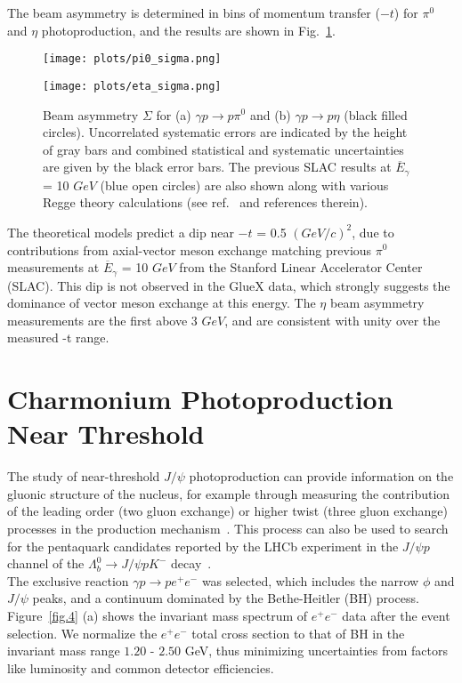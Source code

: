 \documentclass[a4paper]{jpconf}
\begin{document}
The beam asymmetry is determined in bins of momentum transfer ($-t$) for $\pi^{0}$ and $\eta$ photoproduction, and the results are shown in Fig.~\ref{fig.3}.

\begin{figure}[h]
    \centering
    \begin{minipage}{16pc}
        \texttt{[image: plots/pi0\_sigma.png]}
    \end{minipage}\hspace{3pc}%
    \begin{minipage}{16pc}
        \texttt{[image: plots/eta\_sigma.png]}
    \end{minipage}
    \caption{\label{fig.3} Beam asymmetry $\Sigma$ for (a) $\gamma p \rightarrow p \pi^{0}$ and (b) $\gamma p \rightarrow p \eta$ (black filled circles). Uncorrelated systematic errors are indicated by the height of gray bars and combined statistical and systematic uncertainties are given by the black error bars. The previous SLAC results at $\overline{{E}}_{\gamma}$ = 10 $GeV$ (blue open circles) are also shown along with various Regge theory calculations (see ref.~\cite{ref.4} and references therein).}
\end{figure}

The theoretical models predict a dip near $-t$ = 0.5 $(GeV/c)^{2}$, due to contributions from axial-vector meson exchange matching previous $\pi^{0}$ measurements at $\overline{E}_{\gamma}$ = 10 $GeV$ from the Stanford Linear Accelerator Center (SLAC). This dip is not observed in the GlueX data, which strongly suggests the dominance of vector meson exchange at this energy. The $\eta$ beam asymmetry measurements are the first above 3 $GeV$, and are consistent with unity over the measured -t range.

\section{Charmonium Photoproduction Near Threshold}
The study of near-threshold $J/\psi$ photoproduction can provide information on the gluonic structure of the nucleus, for example through measuring the contribution of the leading order (two gluon exchange) or higher twist (three gluon exchange) processes in the production mechanism~\cite{ref.5}. This process can also be used to search for the pentaquark candidates reported by the LHCb experiment in the $J/\psi p$ channel of the $\Lambda^{0}_{b} \rightarrow J/\psi p K^{-}$ decay~\cite{ref.5}.\\
The exclusive reaction $\gamma p \rightarrow p e^{+}e^{-}$ was selected, which includes the narrow $\phi$ and $J/\psi$ peaks, and a continuum dominated by the Bethe-Heitler (BH) process. Figure~\ref{fig.4} (a) shows the invariant mass spectrum of $e^{+}e^{-}$ data after the event selection. We normalize the $e^{+}e^{-}$ total cross section to that of BH in the invariant mass range $1.20$ - $2.50$ GeV, thus minimizing uncertainties from factors like luminosity and common detector efficiencies.
\end{document}
